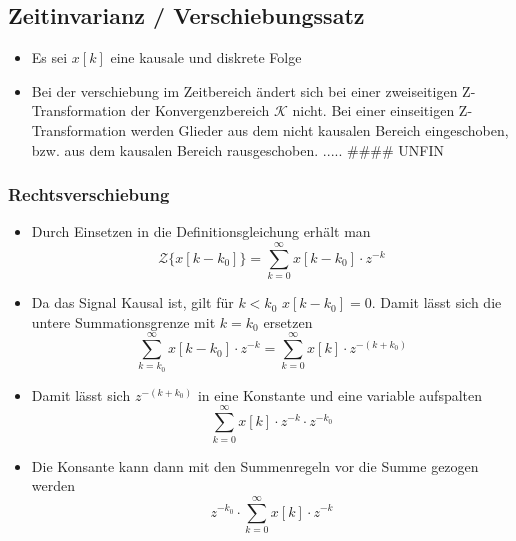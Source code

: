 \documentclass[11pt]{article}
\providecommand{\tightlist}{%
      \setlength{\itemsep}{0pt}\setlength{\parskip}{0pt}}
\def\lt{<}
\begin{document}
    \subsection{Zeitinvarianz /
Verschiebungssatz}\label{zeitinvarianz-verschiebungssatz}

\begin{itemize}
\item
  Es sei \(x[k]\) eine kausale und diskrete Folge
\item
  Bei der verschiebung im Zeitbereich ändert sich bei einer zweiseitigen
  Z-Transformation der Konvergenzbereich \(\mathcal{K}\) nicht. Bei
  einer einseitigen Z-Transformation werden Glieder aus dem nicht
  kausalen Bereich eingeschoben, bzw. aus dem kausalen Bereich
  rausgeschoben. ..... \#\#\#\# UNFIN
\end{itemize}

    \subsubsection{Rechtsverschiebung}\label{rechtsverschiebung}

\begin{itemize}
\tightlist
\item
  Durch Einsetzen in die Definitionsgleichung erhält man
  \[\mathcal{Z}\{x[k-k_0]\} = \sum_{k=0}^\infty x[k-k_0] \cdot z^{-k}\]
\end{itemize}

    \begin{itemize}
\tightlist
\item
  Da das Signal Kausal ist, gilt für \(k \lt k_0\) \(x[k-k_0] = 0\).
  Damit lässt sich die untere Summationsgrenze mit \(k=k_0\) ersetzen
  \[\sum_{k=k_0}^\infty x[k-k_0] \cdot z^{-k} = \sum_{k=0}^\infty x[k] \cdot z^{-(k+k_0)}\]
\end{itemize}

    \begin{itemize}
\tightlist
\item
  Damit lässt sich \(z^{-(k+k_0)}\) in eine Konstante und eine variable
  aufspalten \[\sum_{k=0}^\infty x[k] \cdot z^{-k} \cdot z^{-k_0}\]
\end{itemize}

    \begin{itemize}
\tightlist
\item
  Die Konsante kann dann mit den Summenregeln vor die Summe gezogen
  werden \[z^{-k_0} \cdot \sum_{k=0}^\infty x[k] \cdot z^{-k}\]
\end{itemize}
\end{document}

